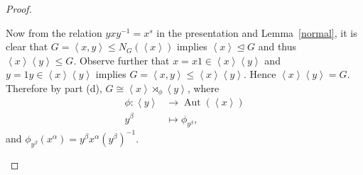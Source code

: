 \documentclass[10pt]{amsart}
\newcommand{\Aut}[1]{\operatorname{Aut}\left(#1\right)}
\begin{document}
\begin{thm}
\begin{proof}
\begin{enumerate}[(a)]
      Now from the relation $yxy^{-1} = x^s$ in the presentation and Lemma~\ref{normal}, it is clear that $G = \left<x, y\right> \leq N_G(\left<x\right>)$ implies $\left<x\right> \unlhd G$ and thus $\left<x\right>\left<y\right> \leq G$.
      Observe further that $x = x1 \in \left<x\right>\left<y\right>$ and $y = 1y \in \left<x\right>\left<y\right>$ implies $G = \left<x, y\right>\leq \left<x\right>\left<y\right>$.
      Hence $\left<x\right>\left<y\right> = G$.
      Therefore by part (d), $G \cong \left<x\right> \rtimes_{\phi} \left<y\right>$, where 
      \begin{align*}
        \phi \colon \left<y\right> &\rightarrow \Aut{\left<x\right>}\\
        y^\beta &\mapsto \phi_{y^\beta},
      \end{align*} 
      and $\phi_{y^\beta}(x^\alpha) = y^\beta x^\alpha (y^\beta)^{-1}$.
    \end{enumerate}
  \end{proof}
\end{thm}
\end{document}
